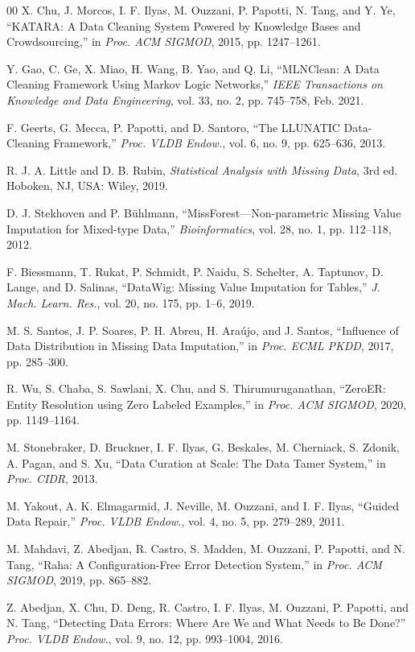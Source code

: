 \documentclass[sigconf]{acmart}
\begin{document}
\begin{thebibliography}{00}
X. Chu, J. Morcos, I. F. Ilyas, M. Ouzzani, P. Papotti, N. Tang, and Y. Ye,
``KATARA: A Data Cleaning System Powered by Knowledge Bases and Crowdsourcing,''
in \textit{Proc. ACM SIGMOD}, 2015, pp. 1247--1261.

Y. Gao, C. Ge, X. Miao, H. Wang, B. Yao, and Q. Li,
``MLNClean: A Data Cleaning Framework Using Markov Logic Networks,''
\textit{IEEE Transactions on Knowledge and Data Engineering},
vol. 33, no. 2, pp. 745--758, Feb. 2021.

F. Geerts, G. Mecca, P. Papotti, and D. Santoro,
``The LLUNATIC Data-Cleaning Framework,''
\textit{Proc. VLDB Endow.}, vol. 6, no. 9, pp. 625--636, 2013.

R. J. A. Little and D. B. Rubin,
\textit{Statistical Analysis with Missing Data}, 3rd ed.
Hoboken, NJ, USA: Wiley, 2019.

D. J. Stekhoven and P. B\"{u}hlmann,
``MissForest---Non-parametric Missing Value Imputation for Mixed-type Data,''
\textit{Bioinformatics}, vol. 28, no. 1, pp. 112--118, 2012.

F. Biessmann, T. Rukat, P. Schmidt, P. Naidu, S. Schelter, A. Taptunov, D. Lange, and D. Salinas,
``DataWig: Missing Value Imputation for Tables,''
\textit{J. Mach. Learn. Res.}, vol. 20, no. 175, pp. 1--6, 2019.

M. S. Santos, J. P. Soares, P. H. Abreu, H. Ara\'{u}jo, and J. Santos,
``Influence of Data Distribution in Missing Data Imputation,''
in \textit{Proc. ECML PKDD}, 2017, pp. 285--300.

R. Wu, S. Chaba, S. Sawlani, X. Chu, and S. Thirumuruganathan,
``ZeroER: Entity Resolution using Zero Labeled Examples,''
in \textit{Proc. ACM SIGMOD}, 2020, pp. 1149--1164.

M. Stonebraker, D. Bruckner, I. F. Ilyas, G. Beskales, M. Cherniack, S. Zdonik, A. Pagan, and S. Xu,
``Data Curation at Scale: The Data Tamer System,''
in \textit{Proc. CIDR}, 2013.

M. Yakout, A. K. Elmagarmid, J. Neville, M. Ouzzani, and I. F. Ilyas,
``Guided Data Repair,''
\textit{Proc. VLDB Endow.},
vol. 4, no. 5, pp. 279--289, 2011.

M. Mahdavi, Z. Abedjan, R. Castro, S. Madden, M. Ouzzani, P. Papotti, and N. Tang,
``Raha: A Configuration-Free Error Detection System,''
in \textit{Proc. ACM SIGMOD}, 2019, pp. 865--882.

Z. Abedjan, X. Chu, D. Deng, R. Castro, I. F. Ilyas, M. Ouzzani, P. Papotti, and N. Tang,
``Detecting Data Errors: Where Are We and What Needs to Be Done?''
\textit{Proc. VLDB Endow.}, vol. 9, no. 12, pp. 993--1004, 2016.


\end{thebibliography}
\end{document}
